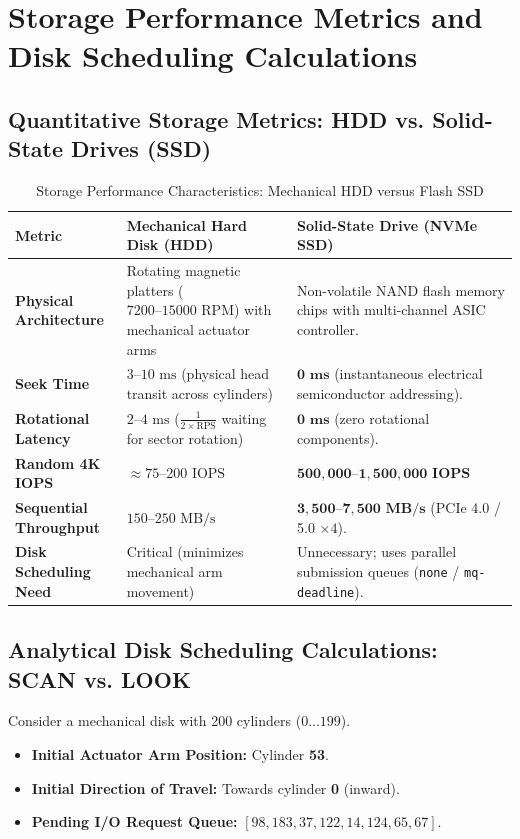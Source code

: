 \section{Storage Performance Metrics and Disk Scheduling Calculations}
\label{sec:os_storage_scheduling}

\subsection{Quantitative Storage Metrics: HDD vs. Solid-State Drives (SSD)}
\begin{table}[htbp]
\centering
\small
\caption{Storage Performance Characteristics: Mechanical HDD versus Flash SSD}
\label{tab:hdd_vs_ssd}
\begin{tabularx}{\textwidth}{l p{4.5cm} X}
\toprule
\textbf{Metric} & \textbf{Mechanical Hard Disk (HDD)} & \textbf{Solid-State Drive (NVMe SSD)} \\
\midrule
\textbf{Physical Architecture} & Rotating magnetic platters ($7200\text{--}15000\text{ RPM}$) with mechanical actuator arms & Non-volatile NAND flash memory chips with multi-channel ASIC controller. \\
\textbf{Seek Time} & $3\text{--}10\text{ ms}$ (physical head transit across cylinders) & $\mathbf{0\text{ ms}}$ (instantaneous electrical semiconductor addressing). \\
\textbf{Rotational Latency} & $2\text{--}4\text{ ms}$ ($\frac{1}{2 \times \text{RPS}}$ waiting for sector rotation) & $\mathbf{0\text{ ms}}$ (zero rotational components). \\
\textbf{Random 4K IOPS} & $\approx 75\text{--}200\text{ IOPS}$ & $\mathbf{500,000\text{--}1,500,000\text{ IOPS}}$ \\
\textbf{Sequential Throughput} & $150\text{--}250\text{ MB/s}$ & $\mathbf{3,500\text{--}7,500\text{ MB/s}}$ (PCIe 4.0 / 5.0 $\times 4$). \\
\textbf{Disk Scheduling Need} & Critical (minimizes mechanical arm movement) & Unnecessary; uses parallel submission queues (\texttt{none} / \texttt{mq-deadline}). \\
\bottomrule
\end{tabularx}
\end{table}

\subsection{Analytical Disk Scheduling Calculations: SCAN vs. LOOK}
Consider a mechanical disk with 200 cylinders ($0\dots 199$).
\begin{itemize}
    \item \textbf{Initial Actuator Arm Position:} Cylinder \textbf{53}.
    \item \textbf{Initial Direction of Travel:} Towards cylinder \textbf{0} (inward).
    \item \textbf{Pending I/O Request Queue:} $[98, 183, 37, 122, 14, 124, 65, 67]$.
\end{itemize}

